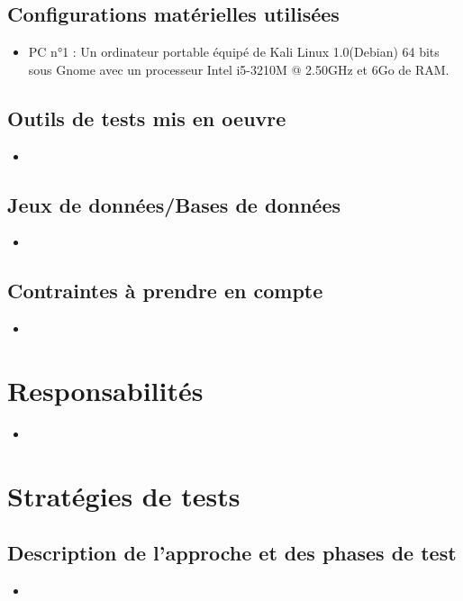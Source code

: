 \documentclass{../res/univ-projet}
\begin{document}
\subsection{Configurations matérielles utilisées}
\begin{itemize}
 \item PC n°1 : Un ordinateur portable équipé de Kali Linux 1.0(Debian) 64 bits sous Gnome avec un processeur Intel i5-3210M @ 2.50GHz et 6Go de RAM.

\end{itemize}

\subsection{Outils de tests mis en oeuvre}
\begin{itemize}
 \item 
\end{itemize}

\subsection{Jeux de données/Bases de données}
\begin{itemize}
 \item 
\end{itemize}

\subsection{Contraintes à prendre en compte}
\begin{itemize}
 \item 
\end{itemize}




\section{Responsabilités}

\begin{itemize}
 \item 
\end{itemize}


\section{Stratégies de tests}

\subsection{Description de l'approche et des phases de test}
\begin{itemize}
 \item 
\end{itemize}
\end{document}
